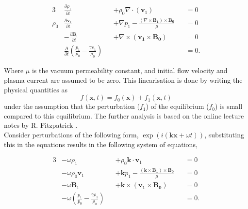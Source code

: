 \documentclass[a4paper]{article}
\begin{document}
\begin{alignat}{3}
    &\frac{\partial \rho_1}{\partial t} &&+ \rho_0 \nabla  \cdot (\mathbf v_1) &&= 0 \tag{mass}\label{eq:masslin}\\
    \rho_0&\frac{\partial \mathbf v_1}{\partial t} &&+  \nabla p_1 - \frac{(\nabla \times \mathbf{B_1}) \times \mathbf{B_0}}{\mu} &&= 0 \tag{moment}\label{eq:cauchymomentlin}\\
    &-\frac{\partial \mathbf B_1}{\partial t} &&+ \nabla \times (\mathbf{v_1} \times \mathbf{B_0}) &&= 0 \tag{charge}\label{eq:faradaylin}\\
    &\frac{\partial}{\partial t}(\frac{p_1}{p_0} - \frac{\gamma\rho_1}{\rho_0}) && &&= 0 \tag{energy}\label{eq:energylin}.
\end{alignat}

Where $\mu$ is the vacuum permeability constant, and initial flow velocity and plasma current are assumed to be zero. This linearisation is done by writing the physical quantities as
\begin{equation*}
    f(\mathbf{x},t) = f_0(\mathbf{x}) + f_1(\mathbf{x},t)
\end{equation*}
under the assumption that the perturbation ($f_1$) of the equilibrium ($f_0$) is small compared to this equilibrium.
The further analysis is based on the online lecture notes by R. Fitzpatrick \cite{Fitzpatricknotes}.\\

Consider perturbations of the following form, $\exp(i(\mathbf{kx} + \omega t))$, substituting this in the equations results in the following system of equations,

\begin{alignat}{3}
    &-\omega\rho_1 &&+  \rho_0 \mathbf{k}\cdot\mathbf v_1 &&= 0 \label{eq:MHD_linear_wave_mass}\\
    &-\omega\rho_0\mathbf v_1 &&+  \mathbf{k} p_1 - \frac{(\mathbf{k} \times \mathbf{B_1}) \times \mathbf{B_0}}{\mu} &&= 0 \label{eq:MHD_linear_wave_moment}\\
    &-\omega\mathbf B_1&&+ \mathbf{k} \times (\mathbf{v_1} \times \mathbf{B_0}) &&= 0 \label{eq:MHD_linear_wave_charge}\\
    &-\omega(\frac{p_1}{p_0} - \frac{\gamma\rho_1}{\rho_0}) && &&= 0  \label{eq:MHD_linear_wave_enery}.
\end{alignat}
\end{document}
